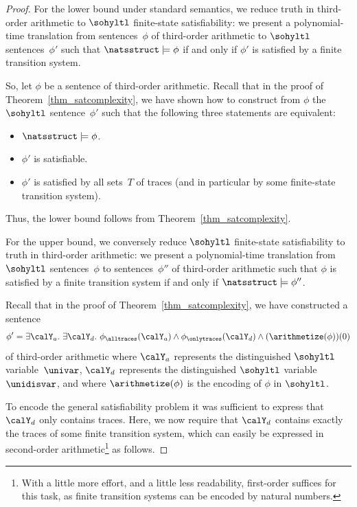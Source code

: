 \begin{proof}
For the lower bound under standard semantics, we reduce truth in third-order arithmetic to $\sohyltl$ finite-state satisfiability: we present a polynomial-time translation from sentences~$\phi$ of third-order arithmetic to $\sohyltl$ sentences~$\phi'$ such that $\natsstruct \models \phi$ if and only if $\phi'$ is satisfied by a finite transition system.

So, let $\phi$ be a sentence of third-order arithmetic. Recall that in the proof of Theorem~\ref{thm_satcomplexity}, we have shown how to construct from $\phi$ the $\sohyltl$ sentence~$\phi'$ such that the following three statements are equivalent:
\begin{itemize}
    \item $\natsstruct \models \phi$.
    \item $\phi'$ is satisfiable.
    \item $\phi'$ is satisfied by all sets~$T$ of traces (and in particular by some finite-state transition system).
\end{itemize}
Thus, the lower bound follows from Theorem~\ref{thm_satcomplexity}.

For the upper bound, we conversely reduce $\sohyltl$ finite-state satisfiability to truth in third-order arithmetic: we present a polynomial-time translation from $\sohyltl$ sentences~$\phi$ to sentences~$\phi''$ of third-order arithmetic such that  $\phi$ is satisfied by a finite transition system if and only if  $\natsstruct \models \phi''$.

Recall that in the proof of Theorem~\ref{thm_satcomplexity}, we have constructed a sentence
\[\phi' = \exists \calY_a.\ \exists\calY_d.\ \phi_\alltraces(\calY_a) \wedge \phi_\onlytraces(\calY_d)\wedge (\arithmetize(\phi))(0)\]
of third-order arithmetic where $\calY_a$ represents the distinguished $\sohyltl$ variable~$\univar$, $\calY_d$ represents the distinguished $\sohyltl$ variable~$\unidisvar$, and where $\arithmetize(\phi)$ is the encoding of $\phi$ in $\sohyltl$.

To encode the general satisfiability problem it was sufficient to express that $\calY_d$ only contains traces.
Here, we now require that $\calY_d$ contains exactly the traces of some finite transition system, which can easily be expressed in second-order arithmetic\footnote{With a little more effort, and a little less readability, first-order suffices for this task, as finite transition systems can be encoded by natural numbers.} as follows.


\end{proof}
